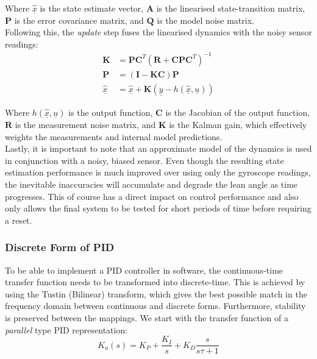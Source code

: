 Where $\hat{\underline{x}}$ is the state estimate vector, $\mathbf{A}$ is the linearised state-transition matrix, $\mathbf{P}$ is the error covariance matrix, and $\mathbf{Q}$ is the model noise matrix. \\

Following this, the \textit{update} step fuses the linearised dynamics with the noisy sensor readings:
\begin{align*}
\mathbf{K} &= \mathbf{P} \mathbf{C}^T (\mathbf{R} + \mathbf{C} \mathbf{P} \mathbf{C}^T)^{-1} \\
\mathbf{P} &= (\mathbf{I} - \mathbf{K C}) \mathbf{P} \\
\hat{\underline{x}} &= \hat{\underline{x}} + \mathbf{K} (\underline{y} - h(\hat{\underline{x}}, \underline{u}))
\end{align*}

Where $h(\hat{\underline{x}}, \underline{u})$ is the output function, $\mathbf{C}$ is the Jacobian of the output function, $\mathbf{R}$ is the measurement noise matrix, and $\mathbf{K}$ is the Kalman gain, which effectively weights the measurements and internal model predictions. \\

Lastly, it is important to note that an approximate model of the dynamics is used in conjunction with a noisy, biased sensor. Even though the resulting state estimation performance is much improved over using only the gyroscope readings, the inevitable inaccuracies will accumulate and degrade the lean angle as time progresses. This of course has a direct impact on control performance and also only allows the final system to be tested for short periods of time before requiring a reset.

\subsubsection{Discrete Form of PID}
To be able to implement a PID controller in software, the continuous-time transfer function needs to be transformed into discrete-time. This is achieved by using the Tustin (Bilinear) transform, which gives the best possible match in the frequency domain between continuous and discrete forms. Furthermore, stability is preserved between the mappings. We start with the transfer function of a \textit{parallel} type PID representation:
\begin{equation*}
K_a(s) = K_P + \frac{K_I}{s} + K_D \frac{s}{s \tau + 1}
\end{equation*}

